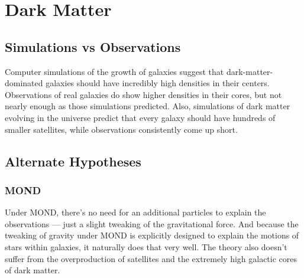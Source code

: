 \chapter{Dark Matter}

\section{Simulations vs Observations}

Computer simulations of the growth of galaxies suggest that dark-matter-dominated galaxies should have incredibly high densities in their centers. Observations of real galaxies do show higher densities in their cores, but not nearly enough as those simulations predicted. Also, simulations of dark matter evolving in the universe predict that every galaxy should have hundreds of smaller satellites, while observations consistently come up short.

\section{Alternate Hypotheses}

\subsection{MOND}
Under MOND, there's no need for an additional particles to explain the observations — just a slight tweaking of the gravitational force. And because the tweaking of gravity under MOND is explicitly designed to explain the motions of stars within galaxies, it naturally does that very well. The theory also doesn't suffer from the overproduction of satellites and the extremely high galactic cores of dark matter.